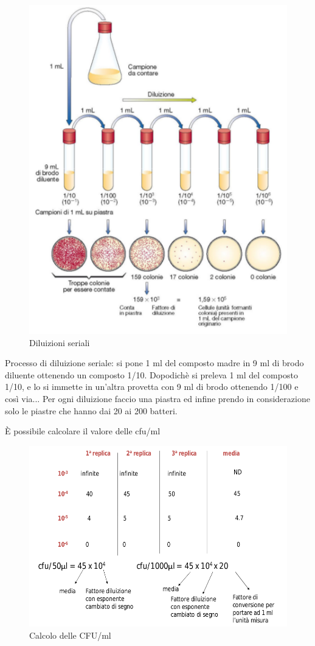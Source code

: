 \documentclass[11pt]{book}
\begin{document}
\begin{itemize}
\begin{enumerate}
\clearpage
\begin{figure}[htp]
\centering
\includegraphics[scale=0.3]{img/Diluizioni seriali.png}
\caption{Diluizioni seriali}
\label{}
\end{figure}

Processo di diluizione seriale: si pone 1 ml del composto madre in 9 ml di brodo diluente ottenendo un composto 1/10. Dopodichè si preleva 1 ml del composto 1/10, e lo si immette in un’altra provetta con 9 ml di brodo ottenendo 1/100 e così via...
Per ogni diluizione faccio una piastra ed infine prendo in considerazione solo le piastre che hanno dai 20 ai 200 batteri.

\`E possibile calcolare il valore delle cfu/ml

\begin{figure}[htp]
\centering
\includegraphics[scale=0.3]{img/Calcolo cfu-ml.png}
\caption{Calcolo delle CFU/ml}
\label{}
\end{figure}


\end{enumerate}
\end{itemize}
\end{document}
